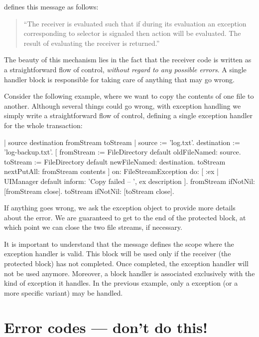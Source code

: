 \documentclass[a4paper,10pt,twoside]{book}
\begin{document}
 defines this message as follows:
\begin{quote}
``The receiver is evaluated such that if during its evaluation an exception corresponding to selector is signaled then action will be evaluated. The result of evaluating the receiver is returned.''
\end{quote}

The beauty of this mechanism lies in the fact that the receiver code is written as a straightforward flow of control, \emph{without regard to any possible errors}. A single handler block is responsible for taking care of anything that may go wrong.

Consider the following example, where we want to copy the contents of one file to another.
Although several things could go wrong, with exception handling we simply write a straightforward flow of control, defining a single exception handler for the whole transaction:
\begin{code}{| source destination fromStream toStream |}
source := 'log.txt'.
destination := 'log-backup.txt'.
[	fromStream := FileDirectory default oldFileNamed: source.
	toStream := FileDirectory default newFileNamed: destination.
	toStream nextPutAll: fromStream contents
]
	on: FileStreamException
	do: [ :ex | UIManager default inform: 'Copy failed -- ', ex description ].
fromStream ifNotNil: [fromStream close].
toStream ifNotNil: [toStream close].
\end{code}
If anything goes wrong, we ask the exception object to provide more details about the error.
We are guaranteed to get to the end of the protected block, at which point we can close the two file streams, if necessary.

It is important to understand  that the message  defines the scope where the exception handler is valid. This block will be used only if the receiver (\ie the protected block) has not completed. Once completed, the exception handler will not be used anymore. Moreover, a block handler is associated exclusively with the kind of exception it handles. In the previous example, only a  exception (or a more specific variant) may be handled.

\section{Error codes --- don't  do this!}
\end{document}
